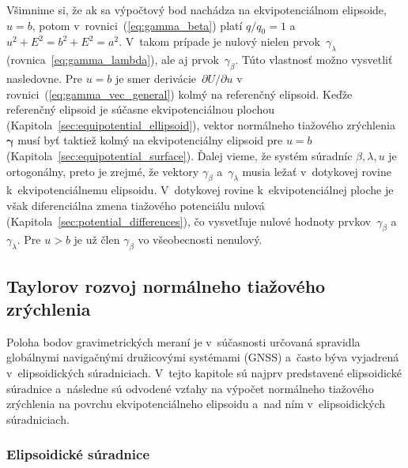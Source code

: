 \documentclass[a4paper,12pt]{book}
\begin{document}
Všimnime si, že ak sa výpočtový bod nachádza na ekvipotenciálnom elipsoide, $u 
= b$, potom v~rovnici~(\ref{eq:gamma_beta}) platí $q \slash q_0 = 1$ a~$u^2 
+ E^2 = b^2 + E^2 = a^2$. V~takom prípade je nulový nielen 
prvok~$\gamma_\lambda$ (rovnica~\ref{eq:gamma_lambda}), ale aj 
prvok~$\gamma_\beta$.  Túto vlastnosť možno vysvetliť nasledovne.  Pre $u = b$ 
je smer derivácie~$\partial U \slash \partial u$ 
v rovnici~(\ref{eq:gamma_vec_general}) kolmý na referenčný elipsoid.  Keďže 
referenčný elipsoid je súčasne ekvipotenciálnou plochou 
(Kapitola~\ref{sec:equipotential_ellipsoid}), vektor normálneho tiažového 
zrýchlenia~$\boldsymbol \gamma$ musí byť taktiež kolmý na ekvipotenciálny 
elipsoid pre $u = b$ (Kapitola~\ref{sec:equipotential_surface}).  Ďalej vieme, 
že systém súradníc $\beta, \lambda, u$ je ortogonálny, preto je zrejmé, že 
vektory $\gamma_\beta$ a~$\gamma_\lambda$ musia ležať v~dotykovej rovine 
k~ekvipotenciálnemu elipsoidu.  V~dotykovej rovine k~ekvipotenciálnej ploche je 
však diferenciálna zmena tiažového potenciálu nulová 
(Kapitola~\ref{sec:potential_differences}), čo vysvetľuje nulové hodnoty 
prvkov~$\gamma_\beta$ a~$\gamma_\lambda$.  Pre $u > b$ je už člen 
$\gamma_\beta$ vo všeobecnosti nenulový.



\subsection{Taylorov rozvoj normálneho tiažového zrýchlenia}
\label{sec:normal_gravity_taylor}

Poloha bodov gravimetrických meraní je v~súčasnosti určovaná spravidla 
globálnymi navigačnými družicovými systémami (GNSS) a~často býva vyjadrená 
v~elipsoidických súradniciach.  V~tejto kapitole sú najprv predstavené 
elipsoidické súradnice a~následne sú odvodené vzťahy na výpočet normálneho 
tiažového zrýchlenia na povrchu ekvipotenciálneho elipsoidu a~nad ním 
v~elipsoidických súradniciach.

\subsubsection{Elipsoidické súradnice}
\end{document}
